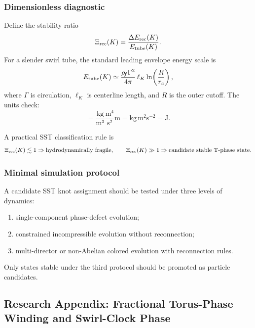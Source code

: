 \subsubsection{Dimensionless diagnostic}
Define the stability ratio
\begin{equation}
    \Xi_{\rm rec}(K)
    = \frac{\Delta E_{\rm rec}(K)}{E_{\rm tube}(K)}.
    \label{eq:xi_reconnection}
\end{equation}
For a slender swirl tube, the standard leading envelope energy scale is
\begin{equation}
    E_{\rm tube}(K)
    \simeq
    \frac{\rho_{\!f}\Gamma^2}{4\pi}\,\ell_K\ln\!\left(\frac{R}{r_c}\right),
    \label{eq:slender_tube_energy_scale}
\end{equation}
where $\Gamma$ is circulation, $\ell_K$ is centerline length, and $R$ is the outer cutoff. The units check:
\begin{equation}
    [\rhoF\Gamma^2\ell_K]
    = \frac{\mathrm{kg}}{\mathrm m^3}\frac{\mathrm m^4}{\mathrm s^2}\mathrm m
    = \mathrm{kg}\,\mathrm m^2\mathrm s^{-2}=\mathrm J.
\end{equation}

A practical SST classification rule is
\begin{equation}
    \Xi_{\rm rec}(K)\lesssim 1 \Rightarrow \text{hydrodynamically fragile},
    \qquad
    \Xi_{\rm rec}(K)\gg 1 \Rightarrow \text{candidate stable T-phase state}.
\end{equation}

\subsubsection{Minimal simulation protocol}
A candidate SST knot assignment should be tested under three levels of dynamics:
\begin{enumerate}
    \item single-component phase-defect evolution;
    \item constrained incompressible evolution without reconnection;
    \item multi-director or non-Abelian colored evolution with reconnection rules.
\end{enumerate}
Only states stable under the third protocol should be promoted as particle candidates.

\subsection{Research Appendix: Fractional Torus-Phase Winding and Swirl-Clock Phase}
\label{app:fractional_torus_phase}

